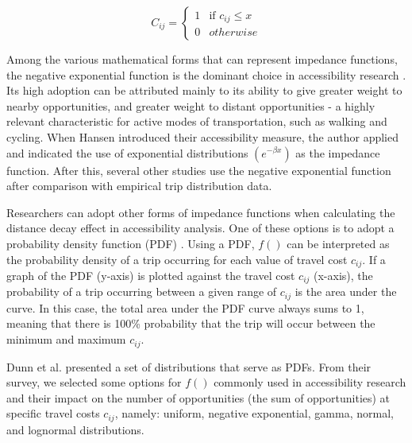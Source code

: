 \documentclass[preprint, 3p,
authoryear]{elsarticle} %
\begin{document}
\begin{equation}
C_{ij} =
\begin{cases}
  1 & \text{if } c_{ij} \le x \\
  0 & otherwise
\end{cases}
\label{eq:cumulative-equation}
\end{equation}

Among the various mathematical forms that can represent impedance
functions, the negative exponential function is the dominant choice in
accessibility research
\citep{hansen1959, apparicio2008comparing, iacono2008access, larsen2010, millward2013active}.
Its high adoption can be attributed mainly to its ability to give
greater weight to nearby opportunities, and greater weight to distant
opportunities - a highly relevant characteristic for active modes of
transportation, such as walking and cycling. When Hansen
\citeyearpar{hansen1959} introduced their accessibility measure, the
author applied and indicated the use of exponential distributions
\((e ^ {-\beta x})\) as the impedance function. After this, several
other studies
\citep{fotheringham1989spatial, de2009exponential, iacono2010, signorino2011gravity, prins2014many}
use the negative exponential function after comparison with empirical
trip distribution data.

Researchers can adopt other forms of impedance functions when
calculating the distance decay effect in accessibility analysis. One of
these options is to adopt a probability density function (PDF)
\citep{soukhov2024}. Using a PDF, \(f()\) can be interpreted as the
probability density of a trip occurring for each value of travel cost
\(c_{ij}\). If a graph of the PDF (y-axis) is plotted against the travel
cost \(c_{ij}\) (x-axis), the probability of a trip occurring between a
given range of \(c_{ij}\) is the area under the curve. In this case, the
total area under the PDF curve always sums to 1, meaning that there is
100\% probability that the trip will occur between the minimum and
maximum \(c_{ij}\).

Dunn et al. \citeyearpar{dunn2023} presented a set of distributions that
serve as PDFs. From their survey, we selected some options for \(f()\)
commonly used in accessibility research and their impact on the number
of opportunities (the sum of opportunities) at specific travel costs
\(c_{ij}\), namely: uniform, negative exponential, gamma, normal, and
lognormal distributions.
\end{document}
